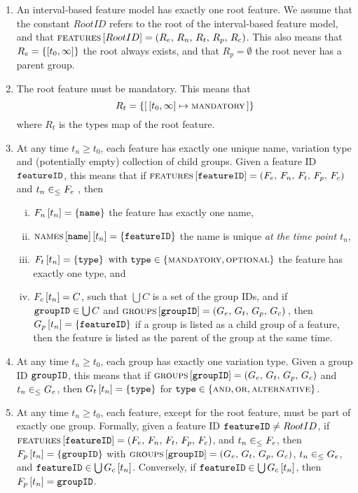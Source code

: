 \begin{enumerate}[\wf{\arabic*}, itemsep=0mm]
   \item An interval-based feature model has exactly one root feature. We assume that the constant $RootID$ refers to the root of the interval-based feature model, and that $\textsc{features} \left[ RootID \right] = \left(R_e,\, R_n,\, R_t,\, R_p,\, R_c\right)$. This also means that $R_e=\set{\interval{t_0}{\forever}}$ \textemdash{} the root always exists, and that $R_p = \emptyset$ \textemdash{} the root never has a parent group.
\item The root feature must be mandatory. This means that $$R_t  = \set{\intervalmapping{t_0}{\forever}{\mandatory}}$$ where $R_t$ is the types map of the root feature. 
\item At any time $t_n \geq t_0$, each feature has exactly one unique name, variation type and (potentially empty) collection of child groups. Given a feature ID $\texttt{featureID}$, this means that if $\textsc{features} \left[ \texttt{featureID} \right] = \left(F_e,\, F_n,\, F_t,\, F_p,\, F_c\right)$ and $t_n \in_\leq F_e$ , then
   \begin{enumerate}[(i)]
      \item $F_n \left[ t_n \right] = \left\{\texttt{name}\right\}$ \textemdash{} the feature has exactly one name,
      \item $\textsc{names} \left[ \texttt{name} \right] \left[ t_n \right] = \left\{\texttt{featureID}\right\}$ \textemdash{} the name is unique \emph{at the time point $t_n$},
      \item $F_t \left[ t_n \right] = \left\{\texttt{type}\right\} \text{ with } \texttt{type} \in \left\{\textsc{mandatory}, \textsc{optional}\right\}$ \textemdash{} the feature has exactly one type, and
      \item $F_c \left[ t_n \right] = C$, such that $\bigcup C$ is a set of the group IDs, and if $\texttt{groupID} \in \bigcup C$ and $\textsc{groups}{} \left[ \texttt{groupID} \right] = \left(G_e,\, G_t,\, G_p,\, G_c\right){}$, then $G_p \left[ t_n \right] = \left\{\texttt{featureID}\right\}$ \textemdash{} if a group is listed as a child group of a feature, then the feature is listed as the parent of the group at the same time.
   \end{enumerate}
   \item At any time $t_n \geq t_0$, each group has exactly one variation type. Given a group ID $\texttt{groupID}$, this means that if $\textsc{groups}{} \left[ \texttt{groupID} \right] = \left(G_e,\, G_t,\, G_p,\, G_c\right)$ and $t_n \in_\leq G_e$, then $G_t \left[ t_n \right] = \left\{\texttt{type}\right\}$ for $\texttt{type} \in \left\{\textsc{and}, \textsc{or}, \textsc{alternative}\right\}$.
   \item At any time $t_n \geq t_0$, each feature, except for the root feature, must be part of exactly one group. Formally, given a feature ID $\texttt{featureID} \neq RootID$, if $\textsc{features} \left[ \texttt{featureID} \right] = \left(F_e,\, F_n,\, F_t,\, F_p,\, F_c\right)$, and $t_n \in_\leq F_e$, then $F_p \left[ t_n \right] = \left\{\texttt{groupID}\right\}$ with $\textsc{groups}{} \left[ \texttt{groupID} \right] = \left(G_e,\, G_t,\, G_p,\, G_c\right)$, $t_n \in_\leq G_e$, and $\texttt{featureID} \in \bigcup G_c \left[ t_n \right]$. Conversely, if $\texttt{featureID} \in \bigcup G_c \left[ t_n \right]$, then $F_p \left[ t_n \right] = \texttt{groupID}$.

\end{enumerate}

